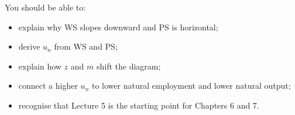 \begin{examtip}[title={Exam Focus: What you must be able to do quickly}]
You should be able to:
\begin{itemize}[leftmargin=1.5em]
\item explain why WS slopes downward and PS is horizontal;
\item derive $u_n$ from WS and PS;
\item explain how $z$ and $m$ shift the diagram;
\item connect a higher $u_n$ to lower natural employment and lower natural output;
\item recognise that Lecture 5 is the starting point for Chapters 6 and 7.
\end{itemize}
\end{examtip}